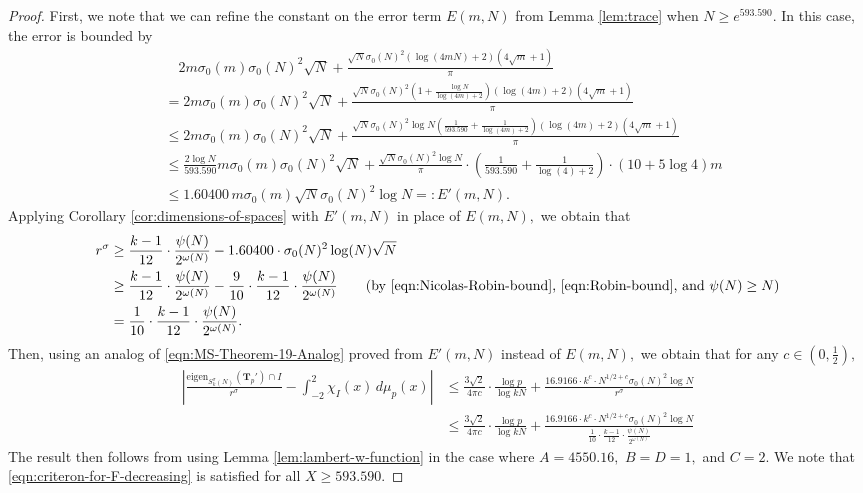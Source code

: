 \documentclass[11pt,letterpaper,reqno]{amsart}
\theoremstyle{definition}
\numberwithin{equation}{section}
\numberwithin{figure}{section}
\numberwithin{table}{section}
\newcommand{\lrp}[1]{\left(#1\right)}
\begin{document}
\begin{proof}
    First, we note that we can refine the constant on the error term $E(m, N)$ from Lemma \ref{lem:trace} when $N \geq e^{593.590}.$ In this case, the error is bounded by
    \begin{align}
    &\quad 2 m \sigma_0(m) \sigma_0(N)^2 \sqrt{N} + \frac{\sqrt{N} \sigma_0(N)^2\lrp{\log(4mN)+2} \lrp{4\sqrt{m}+1}}{\pi}\\
    &= 2 m \sigma_0(m) \sigma_0(N)^2 \sqrt{N} + \frac{\sqrt{N} \sigma_0(N)^2 \left( 1 + \frac{\log N}{\log(4m) + 2}  \right) \left(\log(4m) + 2 \right)  \lrp{4\sqrt{m}+1}}{\pi}\\
    &\leq 2 m \sigma_0(m) \sigma_0(N)^2 \sqrt{N} + \frac{\sqrt{N} \sigma_0(N)^2 \log N\left( \frac{1}{593.590} + \frac{1}{\log(4m) + 2}  \right) \left(\log(4m) + 2 \right) \lrp{4\sqrt{m}+1} }{\pi}\\
    &\leq \frac{2 \log N}{593.590} m \sigma_0(m) \sigma_0(N)^2 \sqrt{N} + \frac{\sqrt{N}\sigma_0(N)^2 \log N}{\pi} \cdot \left( \frac{1}{593.590} + \frac{1}{\log(4) + 2}  \right) \cdot(10 + 5\log 4)m\\
    &\leq 1.60400\, m \sigma_0(m) \sqrt{N} \sigma_0(N)^2 \log N  =: E'(m, N).
    \end{align}
    Applying Corollary \ref{cor:dimensions-of-spaces} with $E'(m, N)$ in place of $E(m, N),$ we obtain that
    \begin{align}
        r^{\sigma} &\geq \frac{k - 1}{12} \cdot \frac{\psi(N)}{2^{\omega(N)}} - 1.60400 \cdot  \sigma_0(N)^2 \log(N) \sqrt{N}\\
        &\geq \frac{k - 1}{12} \cdot \frac{\psi(N)}{2^{\omega(N)}} - \frac{9}{10} \cdot  \frac{k - 1}{12} \cdot \frac{\psi(N)}{2^{\omega(N)}} \qquad \text{(by \eqref{eqn:Nicolas-Robin-bound}, \eqref{eqn:Robin-bound}, and $\psi(N) \geq N$)}\\
        &= \frac{1}{10} \cdot \frac{k - 1}{12} \cdot \frac{\psi(N)}{2^{\omega(N)}}.
    \end{align}
    Then, using an analog of \eqref{eqn:MS-Theorem-19-Analog} proved from $E'(m, N)$ instead of $E(m, N),$ we obtain that for any $c \in \left(0, \frac{1}{2} \right),$
    \begin{align*}
        \left| \frac{\text{eigen}_{S_k^\sigma(N)}(\mathbf{T}_p') \cap I}{r^\sigma} - \int_{-2}^2 \chi_I(x) \, d \mu_p(x)  \right| &\leq \frac{3\sqrt{2}}{4\pi c} \cdot \frac{\log p}{\log kN}  + \frac{16.9166 \cdot k^c \cdot N^{1/2 + c} \sigma_0(N)^2 \log N}{r^\sigma}\\
        &\leq \frac{3\sqrt{2}}{4\pi c} \cdot \frac{\log p}{\log kN} + \frac{16.9166 \cdot k^c \cdot N^{1/2 + c} \sigma_0(N)^2 \log N}{\frac{1}{10} \cdot \frac{k - 1}{12} \cdot \frac{\psi(N)}{2^{\omega(N)}}}
    \end{align*}
The result then follows from using Lemma \ref{lem:lambert-w-function} in the case where $A = 4550.16,$ $B = D = 1,$ and $C = 2.$ We note that \eqref{eqn:criteron-for-F-decreasing} is satisfied for all $X \geq 593.590.$
\end{proof}
\end{document}
